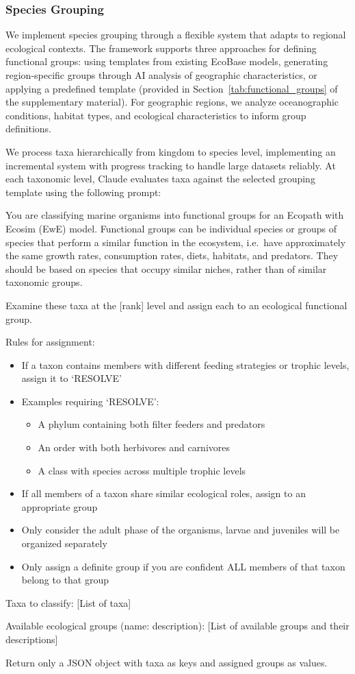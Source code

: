 \subsubsection{Species Grouping}

We implement species grouping through a flexible system that adapts to regional ecological contexts. The framework supports three approaches for defining functional groups: using templates from existing EcoBase models, generating region-specific groups through AI analysis of geographic characteristics, or applying a predefined template (provided in Section~\ref{tab:functional_groups} of the supplementary material). For geographic regions, we analyze oceanographic conditions, habitat types, and ecological characteristics to inform group definitions.

We process taxa hierarchically from kingdom to species level, implementing an incremental system with progress tracking to handle large datasets reliably. At each taxonomic level, Claude evaluates taxa against the selected grouping template using the following prompt:

\begin{prompt}
You are classifying marine organisms into functional groups for an Ecopath with Ecosim (EwE) model. Functional groups can be individual species or groups of species that perform a similar function in the ecosystem, i.e.\ have approximately the same growth rates, consumption rates, diets, habitats, and predators. They should be based on species that occupy similar niches, rather than of similar taxonomic groups.

Examine these taxa at the [rank] level and assign each to an ecological functional group.

Rules for assignment:
\begin{itemize}
\item If a taxon contains members with different feeding strategies or trophic levels, assign it to `RESOLVE'
\item Examples requiring `RESOLVE':
  \begin{itemize}
  \item A phylum containing both filter feeders and predators
  \item An order with both herbivores and carnivores
  \item A class with species across multiple trophic levels
  \end{itemize}
\item If all members of a taxon share similar ecological roles, assign to an appropriate group
\item Only consider the adult phase of the organisms, larvae and juveniles will be organized separately
\item Only assign a definite group if you are confident ALL members of that taxon belong to that group
\end{itemize}

Taxa to classify:
[List of taxa]

Available ecological groups (name: description):
[List of available groups and their descriptions]

Return only a JSON object with taxa as keys and assigned groups as values.
\end{prompt}


